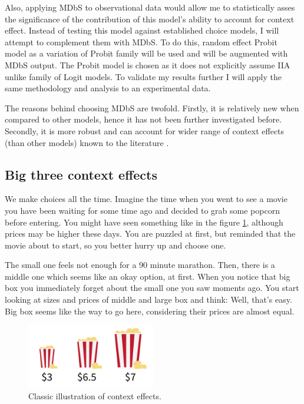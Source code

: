 \documentclass[a4paper,12pt]{article}
\begin{document}
Also, applying MDbS to observational data would allow me to statistically asses the significance of the contribution of this model's ability to account for context effect. Instead of testing this model against established choice models, I will attempt to complement them with MDbS. To do this, random effect Probit model as a variation of Probit family will be used and will be augmented with MDbS output. The Probit model is chosen as it does not explicitly assume IIA unlike family of Logit models. To validate my results further I will apply the same methodology and analysis to an experimental data.

The reasons behind choosing MDbS are twofold. Firstly, it is relatively new when compared to other models, hence it has not been further investigated before. Secondly, it is more robust and can account for wider range of context effects (than other models) known to the literature \citep{noguchi2018multialternative}.


\subsection{Big three context effects}\label{chapter:bigThreeContextEffectsDescription}

We make choices all the time. Imagine the time when you went to see a movie you have been waiting for some time ago and decided to grab some popcorn before entering. You might have seen something like in the figure \ref{fig:decoyPopcornExample}, although prices may be higher these days. You are puzzled at first, but reminded that the movie about to start, so you better hurry up and choose one. 

The small one feels not enough for a 90 minute marathon. Then, there is a middle one which seems like an okay option, at first. When you notice that big box you immediately forget about the small one you saw moments ago. You start looking at sizes and prices of middle and large box and think: Well, that's easy. Big box seems like the way to go here, considering their prices are almost equal. 


\begin{figure}[H]
    \centering
    \includegraphics[width=0.5\textwidth]{staticFiles/popcornDecoy.png}
    \caption{Classic illustration of context effects.}
    \label{fig:decoyPopcornExample}
\end{figure}
\end{document}
